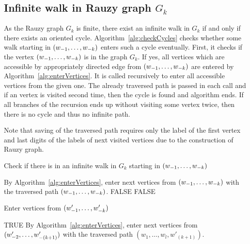 \subsection*{Infinite walk in Rauzy graph $G_k$}
As the Rauzy graph $G_k$ is finite, there exist an infinite walk in $G_k$ if and only if there exists an oriented cycle. Algorithm~\ref{alg:checkCycles}  checks whether some walk starting in $\tuple{1}{k}$ enters such a cycle eventually. First, it  checks if the vertex $\tuple{1}{k}$ is in the graph $G_k$. If yes, all vertices which are accessible by appropriately directed edge from $\tuple{1}{k}$ are entered by Algorithm~\ref{alg:enterVertices}. It is called recursively to enter all accessible vertices from the given one. The already traversed path is passed in each call and if an vertex is visited second time, then the cycle is found and algorithm ends. If all branches of the recursion ends up without visiting some vertex twice, then there is no cycle and thus no infinite path.

Note that saving of the traversed path requires only the label of the first vertex and last digits of the labels of next visited vertices due to the construction of Rauzy graph.
\begin{algorithm}
  \caption{Check if there is in an infinite walk in $G_k$ starting in $\tuple{1}{k}$}
    \label{alg:checkCycles}
  \begin{algorithmic}[1]
		\STATE By Algorithm~\ref{alg:enterVertices}, enter next vertices from $\tuple{1}{k}$ with the traversed path  $\tuple{1}{k}$.
	\ELSE
		\RETURN FALSE
	\ENDIF
	\RETURN FALSE
  \end{algorithmic}
\end{algorithm}

\begin{algorithm}
  \caption{Enter vertices from $\tuple[w']{1}{k}$}
    \label{alg:enterVertices}
  \begin{algorithmic}[1]
			\RETURN TRUE
		\ELSE
			\STATE By Algorithm~\ref{alg:enterVertices}, enter next vertices from $\tuple[w']{2}{(k+1)}$ with the traversed path   $(w_1, \dots, w_l, w'_{(k+1)})$.
		\ENDIF
	\ENDFOR
  \end{algorithmic}
\end{algorithm}


